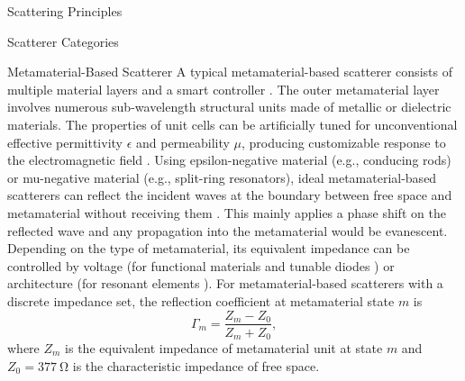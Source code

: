 \documentclass[journal]{IEEEtran}
\begin{document}
\begin{section}{Scattering Principles}
\begin{subsection}{Scatterer Categories}
\begin{subsubsection}{Metamaterial-Based Scatterer}
			A typical metamaterial-based scatterer consists of multiple material layers and a smart controller \cite{Wu2020}.
			The outer metamaterial layer involves numerous sub-wavelength structural units made of metallic or dielectric materials.
			The properties of unit cells can be artificially tuned for unconventional effective permittivity $\epsilon$ and permeability $\mu$, producing customizable response to the electromagnetic field \cite{Zhou2021}.
			Using epsilon-negative material (e.g., conducing rods) or mu-negative material (e.g., split-ring resonators), ideal metamaterial-based scatterers can reflect the incident waves at the boundary between free space and metamaterial without receiving them \cite{Huang2021a}.
			This mainly applies a phase shift on the reflected wave and any propagation into the metamaterial would be evanescent.
			Depending on the type of metamaterial, its equivalent impedance can be controlled by voltage (for functional materials \cite{Singh2020} and tunable diodes \cite{Costa2021}) or architecture (for resonant elements \cite{Bialkowski2008}).
			For metamaterial-based scatterers with a discrete impedance set, the reflection coefficient at metamaterial state $m$ is
			\begin{equation}
				\Gamma_m = \frac{Z_m - Z_0}{Z_m + Z_0},
			\end{equation}
			where $Z_m$ is the equivalent impedance of metamaterial unit at state $m$ and $Z_0 = \qty{377}{\ohm}$ is the characteristic impedance of free space.
		\end{subsubsection}
	\end{subsection}


\end{section}
\end{document}
